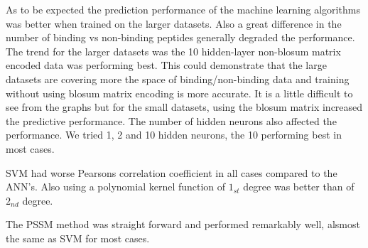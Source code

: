 As to be expected the prediction performance of the machine learning algorithms was better when trained on the larger datasets.
Also a great difference in the number of binding vs non-binding peptides generally degraded the performance.
The trend for the larger datasets was the 10 hidden-layer non-blosum matrix encoded data was performing best. 
This could demonstrate that the large datasets are covering more the space of binding/non-binding data and training without using blosum matrix encoding is more accurate.
It is a little difficult to see from the graphs but for the small datasets, using the blosum matrix increased the predictive performance.
The number of hidden neurons also affected the performance. We tried 1, 2 and 10 hidden neurons, the 10 performing best in most cases.

SVM had worse Pearsons correlation coefficient in all cases compared to the ANN's. Also using a polynomial kernel function of $1_{st}$ degree was better than of $2_{nd}$ degree.

The PSSM method was straight forward and performed remarkably well, alsmost the same as SVM for most cases.

